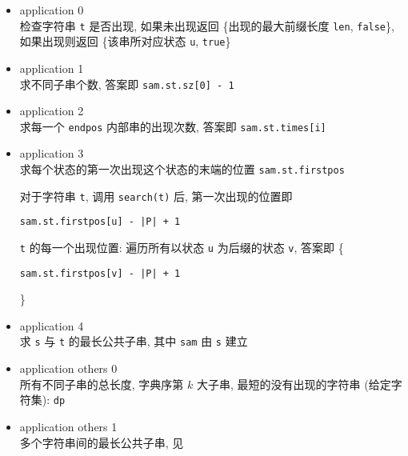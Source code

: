 \begin{itemize}
    \item application 0\\
          检查字符串 \verb|t| 是否出现, 如果未出现返回 \{出现的最大前缀长度 \verb|len|, \verb|false|\}, 如果出现则返回 \{该串所对应状态 \verb|u|, \verb|true|\}

    \item application 1\\
          求不同子串个数, 答案即 \verb|sam.st.sz[0] - 1|

    \item application 2\\
          求每一个 \verb|endpos| 内部串的出现次数, 答案即 \verb|sam.st.times[i]|

    \item application 3\\
          求每个状态的第一次出现这个状态的末端的位置 \verb|sam.st.firstpos|

          对于字符串 \verb|t|, 调用 \verb|search(t)| 后, 第一次出现的位置即 \begin{verbatim}sam.st.firstpos[u] - |P| + 1\end{verbatim}

          \verb|t| 的每一个出现位置: 遍历所有以状态 \verb|u| 为后缀的状态 \verb|v|, 答案即 \{\begin{verbatim}sam.st.firstpos[v] - |P| + 1\end{verbatim}\}

    \item application 4\\
          求 \verb|s| 与 \verb|t| 的最长公共子串, 其中 \verb|sam| 由 \verb|s| 建立

    \item application others 0\\
          所有不同子串的总长度, 字典序第 \(k\) 大子串, 最短的没有出现的字符串 (给定字符集): \verb|dp|

    \item application others 1\\
          多个字符串间的最长公共子串, 见 
\end{itemize}